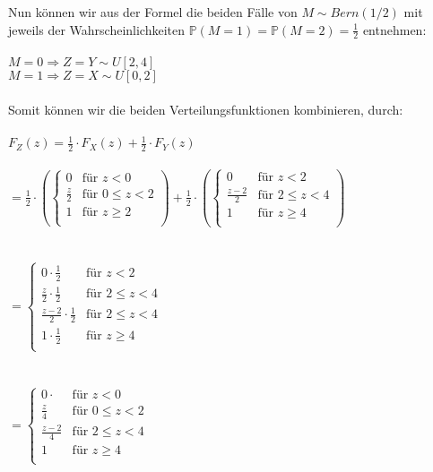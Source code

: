 \documentclass[a4paper]{article}
\begin{document}
Nun können wir aus der Formel die beiden Fälle von $M \sim Bern(1/2)$ mit jeweils der Wahrscheinlichkeiten $\mathbb{P}(M = 1) = \mathbb{P}(M = 2) = \frac{1}{2}$ entnehmen:\\\\
$M = 0 \Rightarrow Z = Y \sim U[2,4]$\\
$M = 1 \Rightarrow Z = X \sim U[0,2]$\\\\
Somit können wir die beiden Verteilungsfunktionen kombinieren, durch:\\\\
$F_Z(z) = \frac{1}{2} \cdot F_X(z) + \frac{1}{2} \cdot F_Y(z)$\\\\
\hspace*{1cm}\(= \frac{1}{2} \cdot \left( \begin{cases}
        0 & \text{für } z < 0 \\
        \frac{z}{2} & \text{für } 0 \leq z < 2 \\
        1 & \text{für } z \geq 2 \\
\end{cases}\right) + \frac{1}{2} \cdot \left( \begin{cases}
        0 & \text{für } z < 2 \\
        \frac{z - 2}{2} & \text{für } 2 \leq z < 4 \\
        1 & \text{für } z \geq 4 \\
\end{cases} \right)\)\\\\\\
\hspace*{1cm}\(= \begin{cases}
        0 \cdot \frac{1}{2} & \text{für } z < 2 \\
        \frac{z}{2} \cdot \frac{1}{2} & \text{für } 2 \leq z < 4 \\
        \frac{z - 2}{2} \cdot \frac{1}{2} & \text{für } 2 \leq z < 4 \\
        1 \cdot \frac{1}{2} & \text{für } z \geq 4 \\
\end{cases}\)\\\\\\
\hspace*{1cm}\(= \begin{cases}
        0 \cdot & \text{für } z < 0 \\
        \frac{z}{4} & \text{für } 0 \leq z < 2 \\
        \frac{z - 2}{4} & \text{für } 2 \leq z < 4 \\
        1 & \text{für } z \geq 4 \\
\end{cases}\)\\\\
\end{document}
